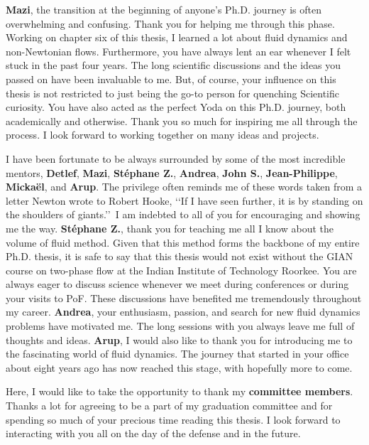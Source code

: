 {\bf Mazi}, the transition at the beginning of anyone's Ph.D. journey is often overwhelming and confusing. Thank you for helping me through this phase. Working on chapter six of this thesis, I learned a lot about fluid dynamics and non-Newtonian flows. Furthermore, you have always lent an ear whenever I felt stuck in the past four years. The long scientific discussions and the ideas you passed on have been invaluable to me. But, of course, your influence on this thesis is not restricted to just being the go-to person for quenching Scientific curiosity. You have also acted as the perfect Yoda on this Ph.D. journey, both academically and otherwise. Thank you so much for inspiring me all through the process. I look forward to working together on many ideas and projects. 

I have been fortunate to be always surrounded by some of the most incredible mentors, {\bf Detlef}, {\bf Mazi}, {\bf St{\'e}phane Z.}, {\bf Andrea}, {\bf John S.}, {\bf Jean-Philippe}, {\bf Micka{\"e}l}, and {\bf Arup}. The privilege often reminds me of these words taken from a letter Newton wrote to Robert Hooke, \lq\lq If I have seen further, it is by standing on the shoulders of giants.\rq\rq\, I am indebted to all of you for encouraging and showing me the way. {\bf St{\'e}phane Z.}, thank you for teaching me all I know about the volume of fluid method. Given that this method forms the backbone of my entire Ph.D. thesis, it is safe to say that this thesis would not exist without the GIAN course on two-phase flow at the Indian Institute of Technology Roorkee. You are always eager to discuss science whenever we meet during conferences or during your visits to PoF. These discussions have benefited me tremendously throughout my career. {\bf Andrea}, your enthusiasm, passion, and search for new fluid dynamics problems have motivated me. The long sessions with you always leave me full of thoughts and ideas. {\bf Arup}, I would also like to thank you for introducing me to the fascinating world of fluid dynamics. The journey that started in your office about eight years ago has now reached this stage, with hopefully more to come. 

Here, I would like to take the opportunity to thank my {\bf committee members}. Thanks a lot for agreeing to be a part of my graduation committee and for spending so much of your precious time reading this thesis. I look forward to interacting with you all on the day of the defense and in the future. 

